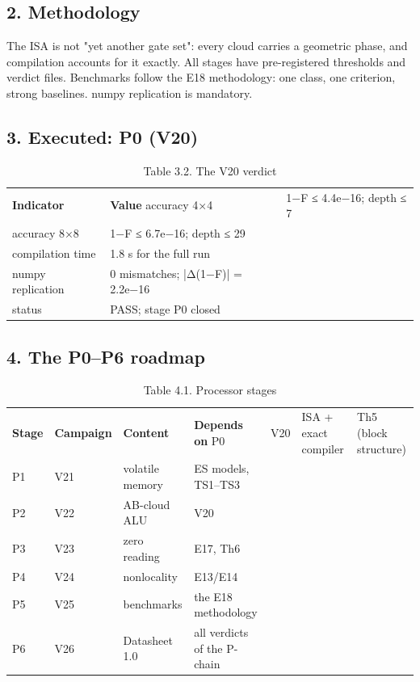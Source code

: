 \documentclass[11pt,a4paper]{article}
\begin{document}
\subsection{2. Methodology}

The ISA is not "yet another gate set": every cloud carries a geometric phase, and compilation accounts for it exactly. All stages have pre-registered thresholds and verdict files. Benchmarks follow the E18 methodology: one class, one criterion, strong baselines. numpy replication is mandatory.

\subsection{3. Executed: P0 (V20)}

\begin{table}[htbp]\centering\small
\caption{Table 3.2. The V20 verdict}
\begin{tabular}{p{} p{}}
\toprule
\textbf{Indicator} & \textbf{Value}
\midrule
accuracy 4×4 & 1−F ≤ 4.4e−16; depth ≤ 7 \\
accuracy 8×8 & 1−F ≤ 6.7e−16; depth ≤ 29 \\
compilation time & 1.8 s for the full run \\
numpy replication & 0 mismatches; |Δ(1−F)| = 2.2e−16 \\
status & PASS; stage P0 closed \\
\bottomrule
\end{tabular}
\end{table}

\subsection{4. The P0–P6 roadmap}

\begin{table}[htbp]\centering\small
\caption{Table 4.1. Processor stages}
\begin{tabular}{p{} p{} p{} p{}}
\toprule
\textbf{Stage} & \textbf{Campaign} & \textbf{Content} & \textbf{Depends on}
\midrule
P0 & V20 & ISA + exact compiler & Th5 (block structure) \\
P1 & V21 & volatile memory & ES models, TS1–TS3 \\
P2 & V22 & AB-cloud ALU & V20 \\
P3 & V23 & zero reading & E17, Th6 \\
P4 & V24 & nonlocality & E13/E14 \\
P5 & V25 & benchmarks & the E18 methodology \\
P6 & V26 & Datasheet 1.0 & all verdicts of the P-chain \\
\bottomrule
\end{tabular}
\end{table}
\end{document}
